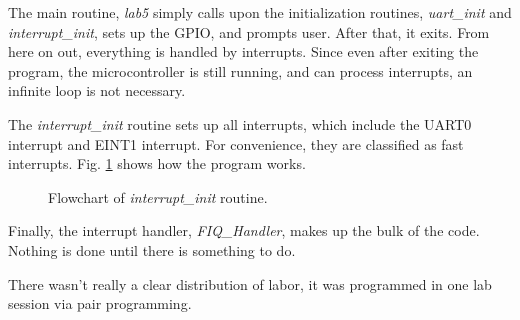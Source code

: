 \documentclass[letterpaper,10pt]{article}
\begin{document}
    \clearpage

    The main routine, \textit{lab5} simply calls upon the initialization routines,
    \textit{uart\_init} and \textit{interrupt\_init}, sets up the GPIO, and
    prompts user. After that, it exits. From here on out, everything is handled
    by interrupts. Since even after exiting the program, the microcontroller is
    still running, and can process interrupts, an infinite loop is not necessary.

    \begin{minipage}{\linewidth}
        
        \label{flo:main}
    \end{minipage}

    The \textit{interrupt\_init} routine sets up all interrupts, which include
    the UART0 interrupt and EINT1 interrupt. For convenience, they are
    classified as fast interrupts. Fig. \ref{flo:interrupt_init} shows how the
    program works.

    \begin{figure}[p]
        
        \caption{Flowchart of \textit{interrupt\_init} routine.}
        \label{flo:interrupt_init}
    \end{figure}

    Finally, the interrupt handler, \textit{FIQ\_Handler}, makes up the bulk of
    the code. Nothing is done until there is something to do.

    \begin{minipage}{\linewidth}
        
        \label{flo:fiq_handler}
    \end{minipage}

    There wasn't really a clear distribution of labor, it was programmed in one
    lab session via pair programming.
\end{document}
